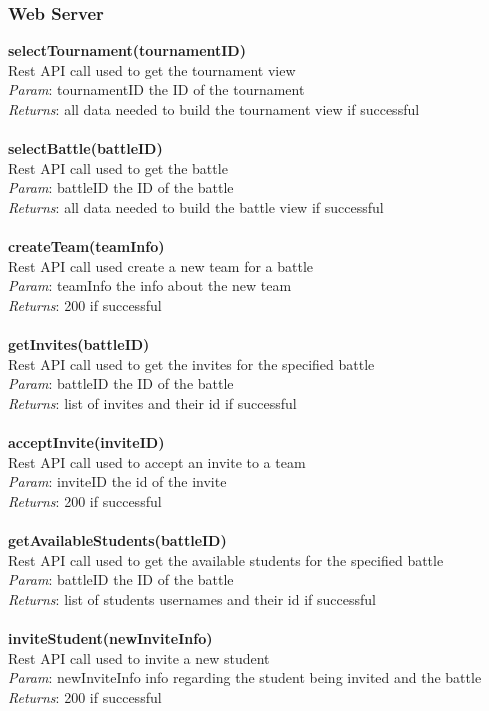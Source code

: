 \documentclass{article}
\begin{document}
\subsubsection{Web Server}
\textbf{selectTournament(tournamentID)}\\
Rest API call used to get the  tournament view\\
\textit{Param}: tournamentID the ID of the tournament\\
\textit{Returns}: all data needed to build the tournament view if successful\\
\\
\textbf{selectBattle(battleID)}\\
Rest API call used to get the battle\\
\textit{Param}: battleID the ID of the battle\\
\textit{Returns}: all data needed to build the battle view if successful\\
\\
\textbf{createTeam(teamInfo)}\\
Rest API call used create a new team for a battle\\
\textit{Param}: teamInfo the info about the new team\\
\textit{Returns}: 200 if successful\\
\\
\textbf{getInvites(battleID)}\\
Rest API call used to get the invites for the specified battle\\
\textit{Param}: battleID the ID of the battle\\
\textit{Returns}: list of invites and their id if successful\\
\\
\textbf{acceptInvite(inviteID)}\\
Rest API call used to accept an invite to a team\\
\textit{Param}: inviteID the id of the invite\\
\textit{Returns}: 200 if successful\\
\\
\textbf{getAvailableStudents(battleID)}\\
Rest API call used to get the available students for the specified battle\\
\textit{Param}: battleID the ID of the battle\\
\textit{Returns}: list of students usernames and their id if successful\\
\\
\textbf{inviteStudent(newInviteInfo)}\\
Rest API call used to invite a new student\\
\textit{Param}: newInviteInfo info regarding the student being invited and the battle\\
\textit{Returns}: 200 if successful\\
\end{document}
